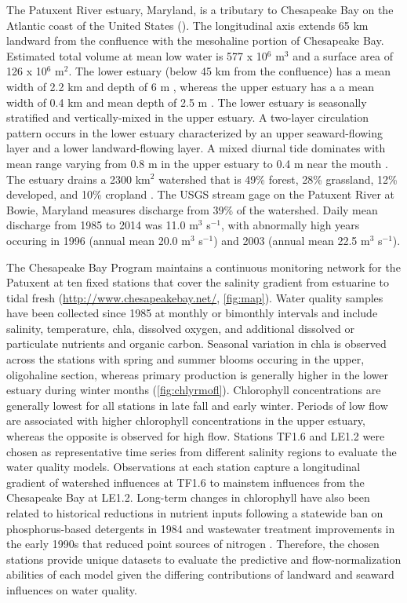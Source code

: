 \documentclass[letterpaper,12pt,oneside]{article}\usepackage[]{graphicx}\usepackage[]{color}
\begin{document}
The Patuxent River estuary, Maryland, is a tributary to Chesapeake Bay on the Atlantic coast of the United States (). The longitudinal axis extends 65 km landward from the confluence with the mesohaline portion of Chesapeake Bay.  Estimated total volume at mean low water is 577 x 10$^6$ m$^3$ and a surface area of 126 x 10$^6$ m$^2$.  The lower estuary (below 45 km from the confluence) has a mean width of 2.2 km and depth of 6 m \citep{Cronin75}, whereas the upper estuary has a a mean width of 0.4 km and mean depth of 2.5 m \citep{Hagythes}.  The lower estuary is seasonally stratified and vertically-mixed in the upper estuary.  A two-layer circulation pattern occurs in the lower estuary characterized by an upper seaward-flowing layer and a lower landward-flowing layer.  A mixed diurnal tide dominates with mean range varying from 0.8 m in the upper estuary to 0.4 m near the mouth \citep{Boicourt98}.  The estuary drains a 2300 km$^2$ watershed that is 49\% forest, 28\% grassland, 12\% developed, and 10\% cropland \citep{Jordan03}.  The \ac{USGS} stream gage on the Patuxent River at Bowie, Maryland measures discharge from 39\% of the watershed.  Daily mean discharge from 1985 to 2014 was 11.0 m$^3$ s$^{-1}$, with abnormally high years occuring in 1996 (annual mean 20.0 m$^3$ s$^{-1}$) and 2003 (annual mean 22.5  m$^3$ s$^{-1}$). 

The Chesapeake Bay Program maintains a continuous monitoring network for the Patuxent at ten fixed stations that cover the salinity gradient from estuarine to tidal fresh (\href{http://www.chesapeakebay.net/}{http://www.chesapeakebay.net/}, \cref{fig:map}).  Water quality samples have been collected since 1985 at monthly or bimonthly intervals and include salinity, temperature, \ac{chla}, dissolved oxygen, and additional dissolved or particulate nutrients and organic carbon.  Seasonal variation in \ac{chla} is observed across the stations with spring and summer blooms occuring in the upper, oligohaline section, whereas primary production is generally higher in the lower estuary during winter months (\cref{fig:chlyrmofl}).  Chlorophyll concentrations are generally lowest for all stations in late fall and early winter.  Periods of low flow are associated with higher chlorophyll concentrations in the upper estuary, whereas the opposite is observed for high flow.  Stations TF1.6 and LE1.2 were chosen as representative time series from different salinity regions to evaluate the water quality models.  Observations at each station capture a longitudinal gradient of watershed influences at TF1.6 to mainstem influences from the Chesapeake Bay at LE1.2.  Long-term changes in chlorophyll have also been related to historical reductions in nutrient inputs following a statewide ban on phosphorus-based detergents in 1984 and wastewater treatment improvements in the early 1990s that reduced point sources of nitrogen \citep{Lung03,Testa08a}.  Therefore, the chosen stations provide unique datasets to evaluate the predictive and flow-normalization abilities of each model given the differing contributions of landward and seaward influences on water quality.
\end{document}
